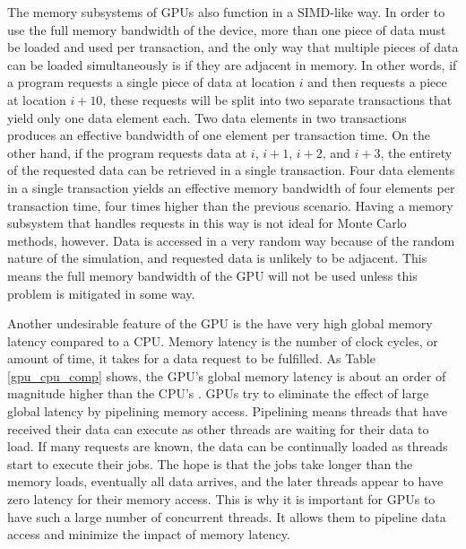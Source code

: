 \documentclass[preprint,12pt]{elsarticle}
\begin{document}
The memory subsystems of GPUs also function in a SIMD-like way.  In order to use the full memory bandwidth of the device, more than one piece of data must be loaded and used per transaction, and the only way that multiple pieces of data can be loaded simultaneously is if they are adjacent in memory.  In other words, if a program requests a single piece of data at location $i$ and then requests a piece at location $i+10$, these requests will be split into two separate transactions that yield only one data element each.  Two data elements in two transactions produces an effective bandwidth of one element per transaction time. On the other hand, if the program requests data at $i$, $i+1$, $i+2$, and $i+3$, the entirety of the requested data can be retrieved in a single transaction.  Four data elements in a single transaction yields an effective memory bandwidth of four elements per transaction time, four times higher than the previous scenario.  Having a memory subsystem that handles requests in this way is not ideal for Monte Carlo methods, however.  Data is accessed in a very random way because of the random nature of the simulation, and requested data is unlikely to be adjacent.  This means the full memory bandwidth of the GPU will not be used unless this problem is mitigated in some way.

Another undesirable feature of the GPU is the have very high global memory latency compared to a CPU.  Memory latency is the number of clock cycles, or amount of time, it takes for a data request to be fulfilled.  As Table \ref{gpu_cpu_comp} shows, the GPU's global memory latency is about an order of magnitude higher than the CPU's \cite{cpu_latency,cuda}.  
GPUs try to eliminate the effect of large global latency by pipelining memory access.  Pipelining means threads that have received their data can execute as other threads are waiting for their data to load.  If many requests are known, the data can be continually loaded as threads start to execute their jobs.  The hope is that the jobs take longer than the memory loads, eventually all data arrives, and the later threads appear to have zero latency for their memory access.  This is why it is important for GPUs to have such a large number of concurrent threads.  It allows them to pipeline data access and minimize the impact of memory latency.
\end{document}
